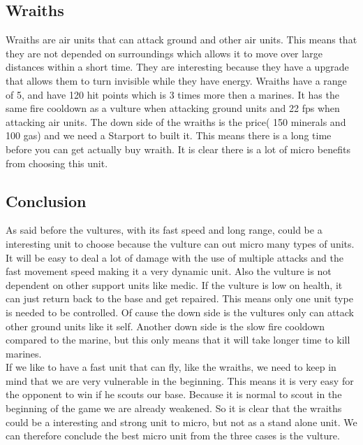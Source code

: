 \subsection{Wraiths}
Wraiths are air units that can attack ground and other air units. This means that they are not depended on surroundings which allows it
to move over large distances within a short time. They are interesting because they have a upgrade that allows them to turn invisible while they have energy. Wraiths 
have a range of 5, and have 120 hit points which is 3 times more then a marines. It has the same fire cooldown
as a vulture when attacking ground units and 22 fps when attacking air units.  
The down side of the wraiths is the price( 150 minerals and 100 gas) and we need a Starport to built it. This means
there is a long time before you can get actually buy wraith. It is clear there is a lot of micro benefits from choosing this unit. 


\subsection{Conclusion}
As said before the vultures, with its fast speed and long range, could be a interesting unit to choose because the vulture can out micro many types of
units. It will be easy to deal a lot of damage with the use of multiple attacks and the fast movement speed making it a very dynamic unit. Also the vulture
is not dependent on other support units like medic. If the vulture is low on health, it can just return back to the base and get repaired. This means
only one unit type is needed to be controlled. Of cause the down side is the vultures only can attack other ground units like it self. Another down side
is the slow fire cooldown compared to the marine, but this only means that it will take longer time to kill marines.\\
If we like to have a fast unit that can fly, like the wraiths, we need to keep in mind that we are very vulnerable in the beginning. This means it is very
easy for the opponent to win if he scouts our base. Because it is normal to scout in the beginning of the game we are already weakened. So it is clear that
the wraiths could be a interesting and strong unit to micro, but not as a stand alone unit. We can therefore conclude the best micro unit from the three cases is the vulture.